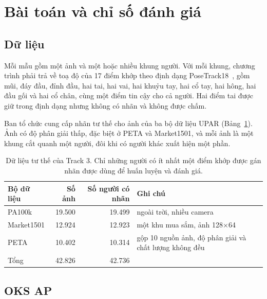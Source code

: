 \documentclass[11pt,a4paper]{article}
\begin{document}
\section{Bài toán và chỉ số đánh giá}
\label{sec:task}

\subsection{Dữ liệu}

Mỗi mẫu gồm một ảnh và một hoặc nhiều khung người. Với mỗi khung, chương trình phải trả về toạ độ của 17 điểm khớp theo định dạng PoseTrack18~\cite{posetrack}, gồm mũi, đáy đầu, đỉnh đầu, hai tai, hai vai, hai khuỷu tay, hai cổ tay, hai hông, hai đầu gối và hai cổ chân, cùng một điểm tin cậy cho cả người. Hai điểm tai được giữ trong định dạng nhưng không có nhãn và không được chấm.

Ban tổ chức cung cấp nhãn tư thế cho ảnh của ba bộ dữ liệu UPAR (Bảng~\ref{tab:data}). Ảnh có độ phân giải thấp, đặc biệt ở PETA và Market1501, và mỗi ảnh là một khung cắt quanh một người, đôi khi có người khác xuất hiện một phần.

\begin{table}[H]
\centering\small
\begin{tabular}{@{}lrrl@{}}
\toprule
Bộ dữ liệu & Số ảnh & Số người có nhãn & Ghi chú \\
\midrule
PA100k & 19.500 & 19.499 & ngoài trời, nhiều camera \\
Market1501 & 12.924 & 12.923 & một khu mua sắm, ảnh 128×64 \\
PETA & 10.402 & 10.314 & gộp 10 nguồn ảnh, độ phân giải và chất lượng không đều \\
\midrule
Tổng & 42.826 & 42.736 & \\
\bottomrule
\end{tabular}
\caption{Dữ liệu tư thế của Track 3. Chỉ những người có ít nhất một điểm khớp được gán nhãn được dùng để huấn luyện và đánh giá.}
\label{tab:data}
\end{table}

\subsection{OKS AP}
\label{sec:metric}
\end{document}
